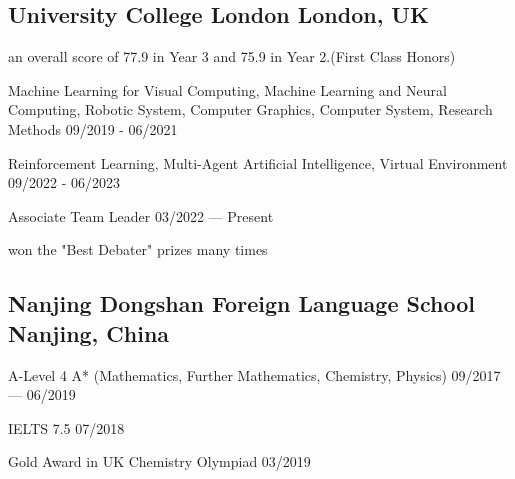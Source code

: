 
\subsection{
    University College London 
    \hfill London, UK
}
    \begin{zitemize}
        \item   an overall score of 77.9 in Year 3 and 75.9 in Year 2.(First Class Honors)
        \item   Machine Learning for Visual Computing, 
                Machine Learning and Neural Computing, 
                Robotic System, 
                Computer Graphics, 
                Computer System,
                Research Methods 
                \hfill 09/2019 - 06/2021
        \item   Reinforcement Learning,    
                Multi-Agent Artificial Intelligence,
                Virtual Environment 
                \hfill 09/2022 - 06/2023
    \end{zitemize}

    \begin{zitemize}
        \item   Associate Team Leader 
                \hfill 03/2022 --- Present
        \item   won the "Best Debater" prizes many times
    \end{zitemize}


\vspace{0.3em}


\subsection{
    Nanjing Dongshan Foreign Language School 
    \hfill Nanjing, China
}
    \begin{zitemize}
        \item   A-Level 4 A* (Mathematics, Further Mathematics, Chemistry, Physics) 
                \hfill 09/2017 --- 06/2019 
        \item   IELTS 7.5 
                \hfill 07/2018 
        \item   Gold Award in UK Chemistry Olympiad
                \hfill 03/2019
    \end{zitemize}


